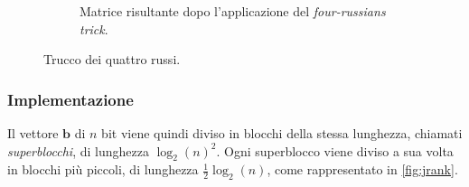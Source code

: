 \begin{figure}[ht]
\begin{subfigure}{0.32\textwidth}
\begin{tikzpicture}[x=0.75pt,y=0.75pt,yscale=-1,xscale=1]
		\end{tikzpicture}
		\caption{Matrice risultante dopo l'applicazione del \textit{four-russians trick}.}
	\end{subfigure}
	\caption{Trucco dei quattro russi.}
	\label{fig:frtrick}
\end{figure}

\subsubsection{Implementazione}
Il vettore $\mathbf{b}$  di $n$ bit viene quindi diviso in blocchi della
stessa lunghezza, chiamati \textit{superblocchi}, di lunghezza
$\log_2(n)^2$. Ogni superblocco viene
diviso a sua volta in blocchi più piccoli, di lunghezza $\frac{1}{2} \log_2(n)$,
come rappresentato in \cref{fig:jrank}.
